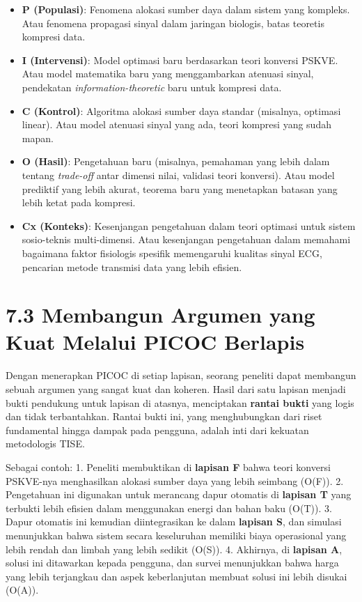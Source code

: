 \documentclass[
  letterpaper,
  DIV=11,
  numbers=noendperiod]{scrreprt}
\providecommand{\tightlist}{%
  \setlength{\itemsep}{0pt}\setlength{\parskip}{0pt}}
\begin{document}
\begin{enumerate}
  \begin{itemize}
  \tightlist
  \item
    \textbf{P (Populasi)}: Fenomena alokasi sumber daya dalam sistem
    yang kompleks. Atau fenomena propagasi sinyal dalam jaringan
    biologis, batas teoretis kompresi data.
  \item
    \textbf{I (Intervensi)}: Model optimasi baru berdasarkan teori
    konversi PSKVE. Atau model matematika baru yang menggambarkan
    atenuasi sinyal, pendekatan \emph{information-theoretic} baru untuk
    kompresi data.
  \item
    \textbf{C (Kontrol)}: Algoritma alokasi sumber daya standar
    (misalnya, optimasi linear). Atau model atenuasi sinyal yang ada,
    teori kompresi yang sudah mapan.
  \item
    \textbf{O (Hasil)}: Pengetahuan baru (misalnya, pemahaman yang lebih
    dalam tentang \emph{trade-off} antar dimensi nilai, validasi teori
    konversi). Atau model prediktif yang lebih akurat, teorema baru yang
    menetapkan batasan yang lebih ketat pada kompresi.
  \item
    \textbf{Cx (Konteks)}: Kesenjangan pengetahuan dalam teori optimasi
    untuk sistem sosio-teknis multi-dimensi. Atau kesenjangan
    pengetahuan dalam memahami bagaimana faktor fisiologis spesifik
    memengaruhi kualitas sinyal ECG, pencarian metode transmisi data
    yang lebih efisien.
  \end{itemize}
\end{enumerate}

\section{\texorpdfstring{\textbf{7.3 Membangun Argumen yang Kuat Melalui
PICOC
Berlapis}}{7.3 Membangun Argumen yang Kuat Melalui PICOC Berlapis}}\label{membangun-argumen-yang-kuat-melalui-picoc-berlapis}

Dengan menerapkan PICOC di setiap lapisan, seorang peneliti dapat
membangun sebuah argumen yang sangat kuat dan koheren. Hasil dari satu
lapisan menjadi bukti pendukung untuk lapisan di atasnya, menciptakan
\textbf{rantai bukti} yang logis dan tidak terbantahkan. Rantai bukti
ini, yang menghubungkan dari riset fundamental hingga dampak pada
pengguna, adalah inti dari kekuatan metodologis TISE.

Sebagai contoh: 1. Peneliti membuktikan di \textbf{lapisan F} bahwa
teori konversi PSKVE-nya menghasilkan alokasi sumber daya yang lebih
seimbang (O(F)). 2. Pengetahuan ini digunakan untuk merancang dapur
otomatis di \textbf{lapisan T} yang terbukti lebih efisien dalam
menggunakan energi dan bahan baku (O(T)). 3. Dapur otomatis ini kemudian
diintegrasikan ke dalam \textbf{lapisan S}, dan simulasi menunjukkan
bahwa sistem secara keseluruhan memiliki biaya operasional yang lebih
rendah dan limbah yang lebih sedikit (O(S)). 4. Akhirnya, di
\textbf{lapisan A}, solusi ini ditawarkan kepada pengguna, dan survei
menunjukkan bahwa harga yang lebih terjangkau dan aspek keberlanjutan
membuat solusi ini lebih disukai (O(A)).
\end{document}
